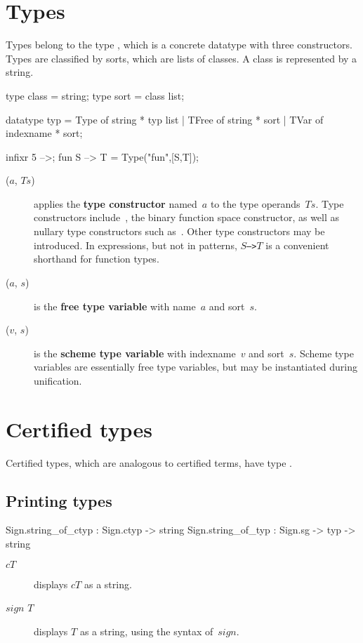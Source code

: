\section{Types}
Types belong to the \ML{} type , which is a concrete
datatype with three constructors.  Types are classified by sorts, which are
lists of classes.  A class is represented by a string.
\begin{ttbox}
type class = string;
type sort  = class list;

datatype typ = Type  of string * typ list
             | TFree of string * sort
             | TVar  of indexname * sort;

infixr 5 -->;
fun S --> T = Type("fun",[S,T]);
\end{ttbox}
\begin{description}
\item[($a$, $Ts$)] 
applies the {\bf type constructor} named~$a$ to the type operands~$Ts$.
Type constructors include~, the binary function space
constructor, as well as nullary type constructors such
as~.  Other type constructors may be introduced.  In
expressions, but not in patterns, \hbox{\tt$S$-->$T$} is a convenient
shorthand for function types.

\item[($a$, $s$)] 
is the {\bf free type variable} with name~$a$ and sort~$s$.

\item[($v$, $s$)] 
is the {\bf scheme type variable} with indexname~$v$ and sort~$s$.  Scheme
type variables are essentially free type variables, but may be instantiated
during unification.
\end{description}


\section{Certified types}
Certified types, which are analogous to certified terms, have type 
.

\subsection{Printing types}
\begin{ttbox} 
Sign.string_of_ctyp :      Sign.ctyp -> string
Sign.string_of_typ  : Sign.sg -> typ -> string
\end{ttbox}
\begin{description}
\item[ $cT$] 
displays $cT$ as a string.

\item[ $sign$ $T$] 
displays $T$ as a string, using the syntax of~$sign$.
\end{description}



